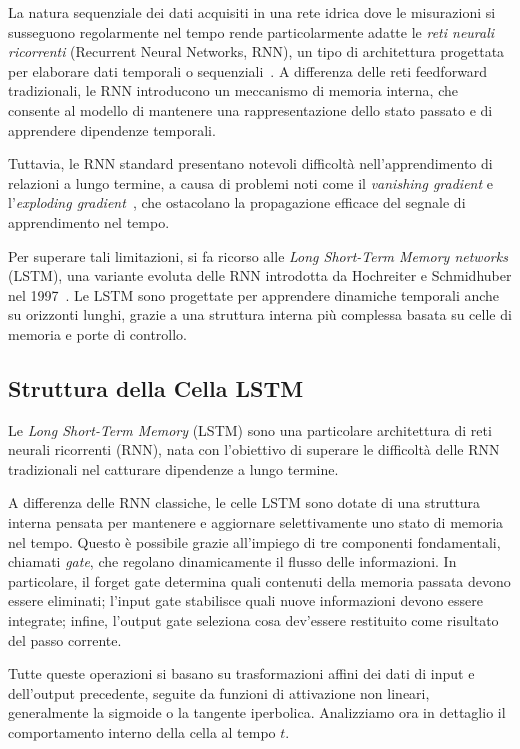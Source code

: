 \documentclass{article}
\begin{document}
La natura sequenziale dei dati acquisiti in una rete idrica dove le misurazioni si susseguono regolarmente nel tempo rende particolarmente adatte le \emph{reti neurali ricorrenti} (Recurrent Neural Networks, RNN), un tipo di architettura progettata per elaborare dati temporali o sequenziali~\cite{elman1990finding}. A differenza delle reti feedforward tradizionali, le RNN introducono un meccanismo di memoria interna, che consente al modello di mantenere una rappresentazione dello stato passato e di apprendere dipendenze temporali.

Tuttavia, le RNN standard presentano notevoli difficoltà nell’apprendimento di relazioni a lungo termine, a causa di problemi noti come il \emph{vanishing gradient} e l’\emph{exploding gradient}~\cite{bengio1994learning}, che ostacolano la propagazione efficace del segnale di apprendimento nel tempo.

Per superare tali limitazioni, si fa ricorso alle \emph{Long Short-Term Memory networks} (LSTM), una variante evoluta delle RNN introdotta da Hochreiter e Schmidhuber nel 1997~\cite{hochreiter1997long}. Le LSTM sono progettate per apprendere dinamiche temporali anche su orizzonti lunghi, grazie a una struttura interna più complessa basata su celle di memoria e porte di controllo.

\subsection{Struttura della Cella LSTM}

Le \textit{Long Short-Term Memory} (LSTM) sono una particolare architettura di reti neurali ricorrenti (RNN), nata con l’obiettivo di superare le difficoltà delle RNN tradizionali nel catturare dipendenze a lungo termine.

A differenza delle RNN classiche, le celle LSTM sono dotate di una struttura interna pensata per mantenere e aggiornare selettivamente uno stato di memoria nel tempo. Questo è possibile grazie all’impiego di tre componenti fondamentali, chiamati \textit{gate}, che regolano dinamicamente il flusso delle informazioni. In particolare, il forget gate determina quali contenuti della memoria passata devono essere eliminati; l’input gate stabilisce quali nuove informazioni devono essere integrate; infine, l’output gate seleziona cosa dev’essere restituito come risultato del passo corrente.

Tutte queste operazioni si basano su trasformazioni affini dei dati di input e dell’output precedente, seguite da funzioni di attivazione non lineari, generalmente la sigmoide o la tangente iperbolica. Analizziamo ora in dettaglio il comportamento interno della cella al tempo $t$.
\end{document}
